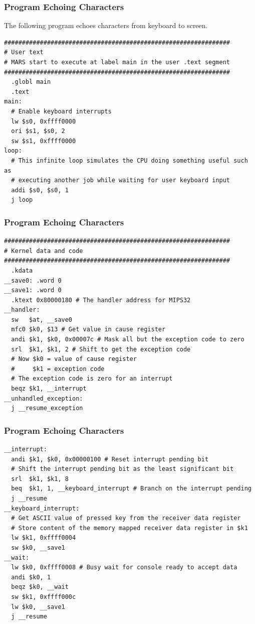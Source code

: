 \documentclass{beamer}
\begin{document}
\lstset{language=[mips]Assembler}
\begin{frame}[fragile]
\frametitle{Program Echoing Characters}

\scriptsize

The following program echoes characters from keyboard to screen.

\begin{lstlisting}
###############################################################
# User text
# MARS start to execute at label main in the user .text segment
###############################################################
  .globl main
  .text
main:
  # Enable keyboard interrupts
  lw $s0, 0xffff0000
  ori $s1, $s0, 2
  sw $s1, 0xffff0000
loop:
  # This infinite loop simulates the CPU doing something useful such as
  # executing another job while waiting for user keyboard input
  addi $s0, $s0, 1
  j loop
\end{lstlisting}

\end{frame}

\begin{frame}[fragile]
\frametitle{Program Echoing Characters}

\scriptsize

\begin{lstlisting}[firstnumber=17]
###############################################################
# Kernel data and code
###############################################################
  .kdata
__save0: .word 0
__save1: .word 0
  .ktext 0x80000180 # The handler address for MIPS32
__handler:
  sw   $at, __save0
  mfc0 $k0, $13 # Get value in cause register
  andi $k1, $k0, 0x00007c # Mask all but the exception code to zero
  srl  $k1, $k1, 2 # Shift to get the exception code
  # Now $k0 = value of cause register
  #     $k1 = exception code
  # The exception code is zero for an interrupt
  beqz $k1, __interrupt
__unhandled_exception:
  j __resume_exception
\end{lstlisting}

\end{frame}

\begin{frame}[fragile]
\frametitle{Program Echoing Characters}

\scriptsize

\begin{lstlisting}[firstnumber=35]
__interrupt:
  andi $k1, $k0, 0x00000100 # Reset interrupt pending bit
  # Shift the interrupt pending bit as the least significant bit
  srl  $k1, $k1, 8
  beq  $k1, 1, __keyboard_interrupt # Branch on the interrupt pending
  j __resume
__keyboard_interrupt:
  # Get ASCII value of pressed key from the receiver data register
  # Store content of the memory mapped receiver data register in $k1
  lw $k1, 0xffff0004
  sw $k0, __save1
__wait:
  lw $k0, 0xffff0008 # Busy wait for console ready to accept data
  andi $k0, 1
  beqz $k0, __wait
  sw $k1, 0xffff000c
  lw $k0, __save1
  j __resume
\end{lstlisting}

\end{frame}
\end{document}
